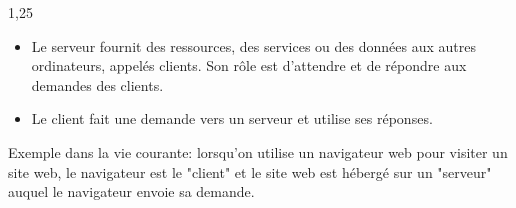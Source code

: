 \documentclass[11pt,a4paper]{exam}
\begin{document}
\begin{spacing}{1,25}
\begin{questions}
\begin{parts}
\begin{subparts}
\begin{solution}
\begin{itemize}
							\item Le serveur fournit des ressources, des services ou des données aux autres ordinateurs, appelés clients. Son rôle est d'attendre et de répondre aux demandes des clients.
							\item Le client fait une demande vers un serveur et utilise ses réponses.
						\end{itemize}
						Exemple dans la vie courante: lorsqu'on utilise un navigateur web pour visiter un site web, le navigateur est le "client" et le site web est hébergé sur un "serveur" auquel le navigateur envoie sa demande.
					\end{solution}
				\end{subparts}				
			\end{parts}

        \end{questions}
    \end{spacing}
\end{document}
